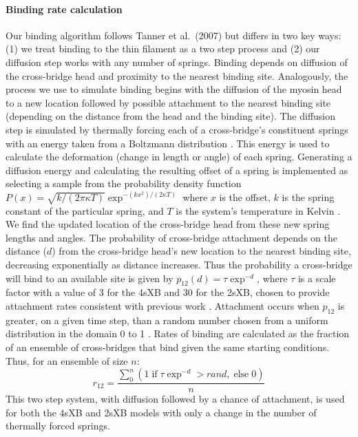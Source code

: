 \documentclass[10pt]{article}
\newcommand{\citep}[1]{\cite{#1}} %
\begin{document}
\paragraph{Binding rate calculation} %
Our binding algorithm follows Tanner et al.~(2007) \citep{Tanner2007} but differs in two key ways: (1) we treat binding to the thin filament as a two step process and (2) our diffusion step works with any number of springs.
Binding depends on diffusion of the cross-bridge head and proximity to the nearest binding site.
Analogously, the process we use to simulate binding begins with the diffusion of the myosin head to a new location followed by possible attachment to the nearest binding site (depending on the distance from the head and the binding site).
The diffusion step is simulated by thermally forcing each of a cross-bridge's constituent springs with an energy taken from a Boltzmann distribution \citep{BergBook, HowardBook}.
This energy is used to calculate the deformation (change in length or angle) of each spring. 
Generating a diffusion energy and calculating the resulting offset of a spring is implemented as selecting a sample from the probability density function $P(x) = \sqrt{k / (2 \pi \kappa T)} \exp^{-(k x^2)/(2 \kappa T)}$ where $x$ is the offset, $k$ is the spring constant of the particular spring, and $T$ is the system's temperature in Kelvin  \citep{DillBook, HowardBook}. %
We find the updated location of the cross-bridge head from these new spring lengths and angles.
The probability of cross-bridge attachment depends on the distance ($d$) from the cross-bridge head's new location to the nearest binding site, decreasing exponentially as distance increases. %
Thus the probability a cross-bridge will bind to an available site is given by $p_{12}(d) = \tau \exp ^{-d}$, where $\tau$ is a scale factor with a value of 3 for the 4sXB and 30 for the 2sXB, chosen to provide attachment rates consistent with previous work \citep{Daniel1998, Tanner2007}.
Attachment occurs when $p_{12}$ is greater, on a given time step, than a random number chosen from a uniform distribution in the domain 0 to 1 \citep{Tanner2007}.
Rates of binding are calculated as the fraction of an ensemble of cross-bridges that bind given the same starting conditions. 
Thus, for an ensemble of size $n$: 
$$r_{12} =  \frac{\sum_0^n \left( 1\; \textrm{if}\; \tau \exp^{-d}>rand ,\; \textrm{else}\; 0 \right)}{n}$$
This two step system, with diffusion followed by a chance of attachment, is used for both the 4sXB and 2sXB models with only a change in the number of thermally forced springs.
\end{document}
